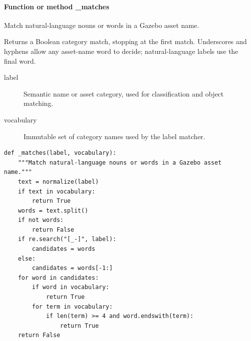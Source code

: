 \documentclass[11pt,a4paper]{book}
\begin{document}
\paragraph{Function or method \_matches}
Match natural-language nouns or words in a Gazebo asset name.

Returns a Boolean category match, stopping at the first match. Underscores and hyphens allow any asset-name word to decide; natural-language labels use the final word.

\begin{description}
\item[label] Semantic name or asset category, used for classification and object matching.
\item[vocabulary] Immutable set of category names used by the label matcher.
\end{description}

\begin{lstlisting}[firstnumber=88]
def _matches(label, vocabulary):
    """Match natural-language nouns or words in a Gazebo asset name."""
    text = normalize(label)
    if text in vocabulary:
        return True
    words = text.split()
    if not words:
        return False
    if re.search("[_-]", label):
        candidates = words
    else:
        candidates = words[-1:]
    for word in candidates:
        if word in vocabulary:
            return True
        for term in vocabulary:
            if len(term) >= 4 and word.endswith(term):
                return True
    return False


\end{lstlisting}
\end{document}
